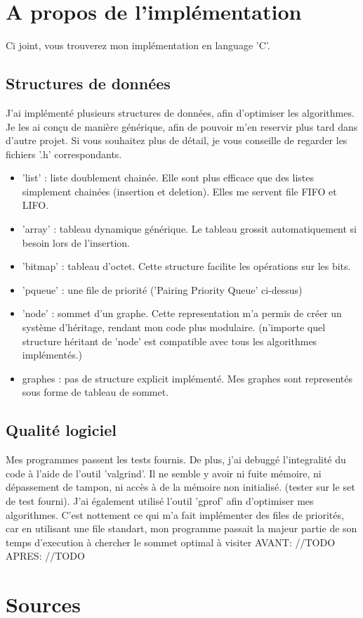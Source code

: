 \documentclass[a4paper,10pt]{article}
\begin{document}
  \newpage
  \section{A propos de l'implémentation}
    Ci joint, vous trouverez mon implémentation en language 'C'.
    \subsection{Structures de données}
      J'ai implémenté plusieurs structures de données, afin d'optimiser les algorithmes. Je les ai conçu de manière générique,
      afin de pouvoir m'en reservir plus tard dans d'autre projet. Si vous souhaitez plus de détail, je vous
      conseille de regarder les fichiers '.h' correspondants.
      \begin{itemize}[label=-]
	\item 'list'   : liste doublement chainée. Elle sont plus efficace que des listes simplement chainées (insertion et deletion).
			Elles me servent file FIFO et LIFO.
	\item 'array'  : tableau dynamique générique. Le tableau grossit automatiquement si besoin lors de l'insertion.
	\item 'bitmap' : tableau d'octet. Cette structure facilite les opérations sur les bits.
	\item 'pqueue' : une file de priorité ('Pairing Priority Queue' ci-dessus)
	\item 'node'   : sommet d'un graphe. Cette representation m'a permis de créer un système d'héritage,
			rendant mon code plus modulaire. (n'importe quel structure héritant de 'node'
			est compatible avec tous les algorithmes implémentés.)
	\item graphes  : pas de structure explicit implémenté. Mes graphes sont representés sous forme de tableau de sommet.
      \end{itemize}
      
      \subsection{Qualité logiciel}
	Mes programmes passent les tests fournis.\newline\newline
	De plus, j'ai debuggé l'integralité du code à l'aide de l'outil 'valgrind'.
	Il ne semble y avoir ni fuite mémoire, ni dépassement de tampon, ni accès à de la mémoire non initialisé.
	(tester sur le set de test fourni).\newline\newline
	J'ai également utilisé l'outil 'gprof' afin d'optimiser mes algorithmes. C'est nottement ce qui m'a fait implémenter des files de priorités,
	car en utilisant une file standart, mon programme passait la majeur partie de son temps d'execution à chercher le sommet optimal à visiter
	AVANT:
	//TODO
	APRES:
	//TODO

  \newpage
  \section{Sources}

    
\end{document}
